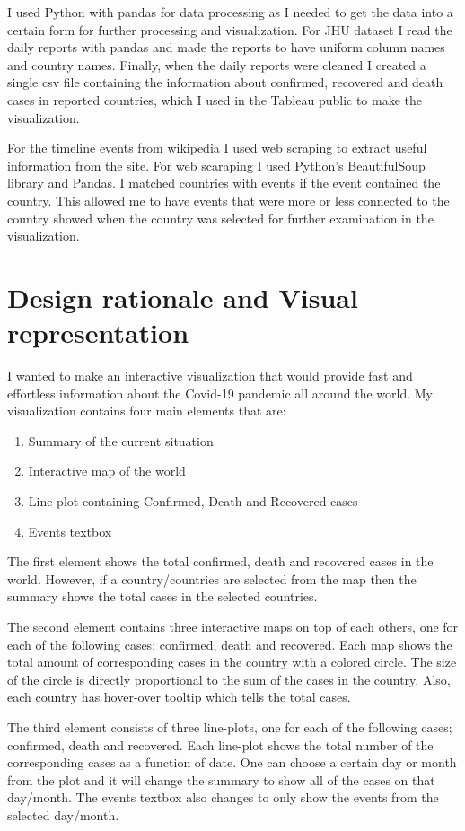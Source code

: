 \documentclass[11pt]{article}
\begin{document}
I used Python with pandas for data processing as I needed to get the data into a certain form for further processing and visualization. For JHU dataset I read the daily reports with pandas and made the reports to have uniform column names and country names. Finally, when the daily reports were cleaned I created a single csv file containing the information about confirmed, recovered and death cases in reported countries, which I used in the Tableau public to make the visualization.

For the timeline events from wikipedia I used web scraping to extract useful information from the site. For web scaraping I used Python's BeautifulSoup library and Pandas. I matched countries with events if the event contained the country. This allowed me to have events that were more or less connected to the country showed when the country was selected for further examination in the visualization.


\section{Design rationale and Visual representation}
I wanted to make an interactive visualization that would provide fast and effortless information about the Covid-19 pandemic all around the world. My visualization contains four main elements that are:
\begin{enumerate}
\item
Summary of the current situation
\item
Interactive map of the world
\item
Line plot containing Confirmed, Death and Recovered cases
\item
Events textbox
\end{enumerate}

The first element shows the total confirmed, death and recovered cases in the world. However, if a country/countries are selected from the map then the summary shows the total cases in the selected countries.

The second element contains three interactive maps on top of each others, one for each of the following cases; confirmed, death and recovered. Each map shows the total amount of corresponding cases in the country with a colored circle. The size of the circle is directly proportional to the sum of the cases in the country. Also, each country has hover-over tooltip which tells the total cases.

The third element consists of three line-plots, one for each of the following cases; confirmed, death and recovered. Each line-plot shows the total number of the corresponding cases as a function of date. One can choose a certain day or month from the plot and it will change the summary to show all of the cases on that day/month. 
The events textbox also changes to only show the events from the selected day/month.
\end{document}
